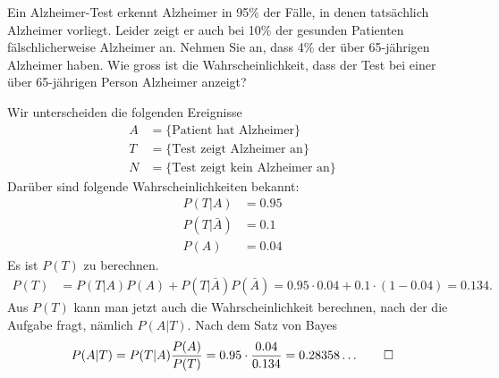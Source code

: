 Ein Alzheimer-Test erkennt Alzheimer in 95\% der Fälle, in denen tatsächlich
Alzheimer vorliegt. Leider zeigt er auch bei 10\% der gesunden Patienten
fälschlicherweise Alzheimer an. Nehmen Sie an, dass 4\% der über 65-jährigen
Alzheimer haben.
Wie gross ist die Wahrscheinlichkeit, dass der Test bei einer über
65-jährigen Person Alzheimer anzeigt?


\begin{loesung}
Wir unterscheiden die folgenden Ereignisse
\begin{align*}
A&=\{\text{Patient hat Alzheimer}\}
\\
T&=\{\text{Test zeigt Alzheimer an}\}
\\
N&=\{\text{Test zeigt kein Alzheimer an}\}
\end{align*}
Darüber sind folgende Wahrscheinlichkeiten bekannt:
\begin{align*}
P(T|A)&=0.95\\
P(T|\bar A)&=0.1\\
P(A)&=0.04
\end{align*}
Es ist $P(T)$ zu berechnen.
\begin{align*}
P(T)&=P(T|A)P(A)+P(T|\bar A)P(\bar A)=0.95\cdot 0.04 + 0.1\cdot (1-0.04)
=0.134.
\end{align*}
Aus $P(T)$ kann man jetzt auch die Wahrscheinlichkeit berechnen, nach
der die Aufgabe fragt, nämlich $P(A|T)$.
Nach dem Satz von Bayes
\[
P(A|T)
=
P(T|A) \frac{P(A)}{P(T)}
=
0.95\cdot\frac{0.04}{0.134}
=
0.28358\dots
\qedhere
\]
\end{loesung}

